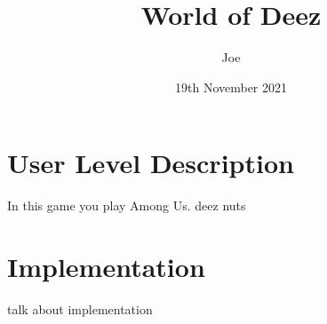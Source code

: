 \documentclass{article}
\title{World of Deez}
\author{Joe}
\date{19th November 2021}
\begin{document}
\maketitle

    \begin{multicols}{2}
        \section{User Level Description}
        In this game you play Among Us. deez nuts
        
        \section{Implementation}

        talk about implementation
        
            
            
            
            
                
            
            

\end{multicols}
\end{document}
